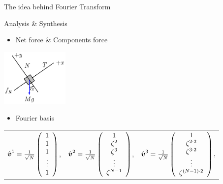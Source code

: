 \begin{frame}{The idea behind Fourier Transform}

\begin{block}{Analysis \& Synthesis}

\begin{itemize}
\itemsep1pt\parskip0pt
\item
  Net force \& Components force
\end{itemize}

\centerline{\includegraphics[width=1.3in]{b.eps}}

\begin{itemize}
\itemsep1pt\parskip0pt
\item
  Fourier basis
\end{itemize}

\begin{tabular}{ccc}
  $\hat{\boldsymbol{v}}^1 = \frac{1}{\sqrt{N}} \left(\begin{array}{c}
    1\\
    1\\
    1\\
    \vdots\\
    1
  \end{array}\right)$, & $\hat{\boldsymbol{v}}^2 = \frac{1}{\sqrt{N}}
  \left(\begin{array}{c}
    1\\
    \zeta^2\\
    \zeta^3\\
    \vdots\\
    \zeta^{N - 1}
  \end{array}\right)$, & $\hat{\boldsymbol{v}}^3 = \frac{1}{\sqrt{N}}
  \left(\begin{array}{c}
    1\\
    \zeta^{2 \cdot 2}\\
    \zeta^{3 \cdot 2}\\
    \vdots\\
    \zeta^{( N - 1) \cdot 2}
  \end{array}\right)$,
\end{tabular}

\end{block}

\end{frame}

